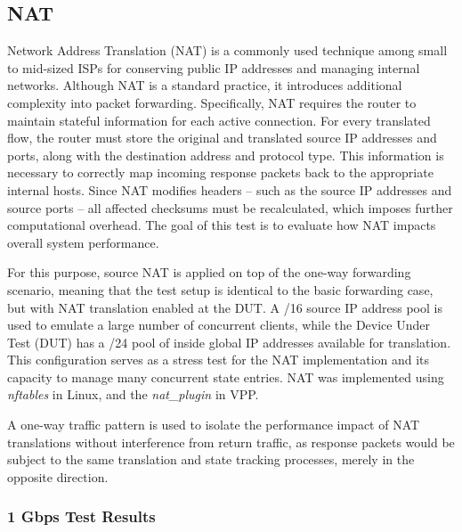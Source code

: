\subsection{NAT}
Network Address Translation (NAT) is a commonly used technique among small to mid-sized ISPs for conserving public IP addresses and managing internal networks. 
Although NAT is a standard practice, it introduces additional complexity into packet forwarding.
Specifically, NAT requires the router to maintain stateful information for each active connection. 
For every translated flow, the router must store the original and translated source IP addresses and ports, along with the destination address and protocol type. 
This information is necessary to correctly map incoming response packets back to the appropriate internal hosts.
Since NAT modifies headers -- such as the source IP addresses and source ports -- all affected checksums must be recalculated, which imposes further computational overhead.
The goal of this test is to evaluate how NAT impacts overall system performance.

For this purpose, source NAT is applied on top of the one-way forwarding scenario, meaning that the test setup is identical to the basic forwarding case, but with NAT translation enabled at the DUT. 
A /16 source IP address pool is used to emulate a large number of concurrent clients, while the Device Under Test (DUT) has a /24 pool of inside global IP addresses available for translation. 
This configuration serves as a stress test for the NAT implementation and its capacity to manage many concurrent state entries.
NAT was implemented using \textit{nftables} in Linux, and the \textit{nat\_plugin} in VPP.

A one-way traffic pattern is used to isolate the performance impact of NAT translations without interference from return traffic, 
as response packets would be subject to the same translation and state tracking processes, merely in the opposite direction.

\subsubsection{1 Gbps Test Results}

